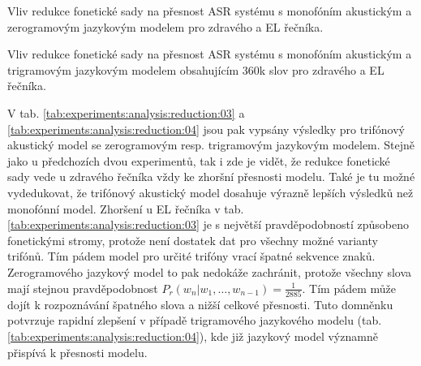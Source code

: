 \begin{table}[htpb]
  \centering
  \def\arraystretch{1.5}
  \caption{Vliv redukce fonetické sady na přesnost ASR systému s monofóním akustickým a zerogramovým jazykovým modelem pro zdravého a EL řečníka.}
  \label{tab:experiments:analysis:reduction:01}
\end{table}

\begin{table}[htpb]
  \centering
  \def\arraystretch{1.5}
  \caption{Vliv redukce fonetické sady na přesnost ASR systému s monofóním akustickým a trigramovým jazykovým modelem obsahujícím 360k slov pro zdravého a EL řečníka.}
  \label{tab:experiments:analysis:reduction:02}
\end{table}

V tab. \ref{tab:experiments:analysis:reduction:03} a \ref{tab:experiments:analysis:reduction:04} jsou pak vypsány výsledky pro trifónový akustický model se zerogramovým resp. trigramovým jazykovým modelem. Stejně jako u předchozích dvou experimentů, tak i zde je vidět, že redukce fonetické sady vede u zdravého řečníka vždy ke zhoršní přesnosti modelu. Také je tu možné vydedukovat, že trifónový akustický model dosahuje výrazně lepších výsledků než monofónní model. Zhoršení u EL řečníka v tab. \ref{tab:experiments:analysis:reduction:03} je s největší pravděpodobností způsobeno fonetickými stromy, protože není dostatek dat pro všechny možné varianty trifónů. Tím pádem model pro určité trifóny vrací špatné sekvence znaků. Zerogramového jazykový model to pak nedokáže zachránit, protože všechny slova mají stejnou pravděpodobnost $P_r(w_n|w_1,\dots,w_{n-1}) = \frac{1}{2885}$. Tím pádem může dojít k rozpoznávání špatného slova a nižší celkové přesnosti. Tuto domněnku potvrzuje rapidní zlepšení v případě trigramového jazykového modelu (tab. \ref{tab:experiments:analysis:reduction:04}), kde již jazykový model významně přispívá k přesnosti modelu.

